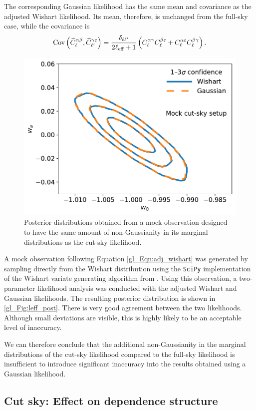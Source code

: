 The corresponding Gaussian likelihood has the same mean and covariance as the adjusted Wishart likelihood. Its mean, therefore, is unchanged from the full-sky case, while the covariance is
\begin{equation}
\text{Cov} \left(
\widehat{C}_\ell^{\alpha \beta},
\widehat{C}_{\ell'}^{\gamma \varepsilon}
\right)
= \frac{\delta_{\ell \ell'}}{2 \ell_\text{eff} + 1} \left(
C_\ell^{\alpha \gamma} C_\ell^{\beta \varepsilon}
+ C_\ell^{\alpha \varepsilon} C_\ell^{\beta \gamma} \right).
\end{equation}

\begin{figure}
\centering
\includegraphics[width=.5\textwidth]{leff_post}
\caption{Posterior distributions obtained from a mock observation designed to have the same amount of non-Gaussianity in its marginal distributions as the cut-sky likelihood.}
\label{gl_Fig:leff_post}
\end{figure}

A mock observation following Equation \eqref{gl_Eqn:adj_wishart} was generated by sampling directly from the Wishart distribution using the \texttt{SciPy} implementation of the Wishart variate generating algorithm from \citet{Smith1972}. Using this observation, a two-parameter likelihood analysis was conducted with the adjusted Wishart and Gaussian likelihoods. The resulting posterior distribution is shown in \autoref{gl_Fig:leff_post}. There is very good agreement between the two likelihoods. Although small deviations are visible, this is highly likely to be an acceptable level of inaccuracy.

We can therefore conclude that the additional non-Gaussianity in the marginal distributions of the cut-sky likelihood compared to the full-sky likelihood is insufficient to introduce significant inaccuracy into the results obtained using a Gaussian likelihood.

\subsection{Cut sky: Effect on dependence structure}
\label{gl_Sec:ma_dependence}

